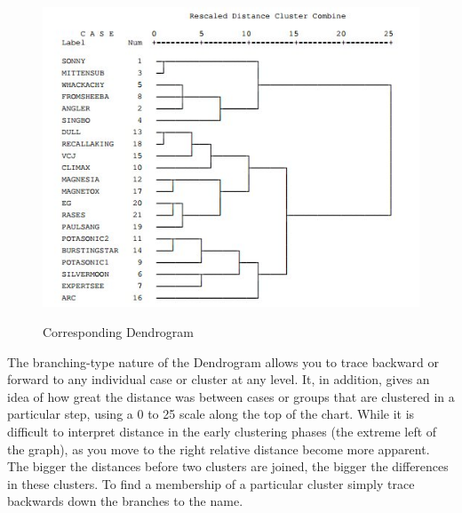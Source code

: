 \documentclass[a4paper,12pt]{article}
\begin{document}
\begin{figure}
	\includegraphics[scale=1.0]{images/Dendro}\\
	\caption{Corresponding Dendrogram}
\end{figure}

The branching-type nature of the Dendrogram allows you to trace backward or forward to any individual
case or cluster at any level. It, in addition, gives an idea of how great the distance was between cases or
groups that are clustered in a particular step, using a 0 to 25 scale along the top of the chart. While it is
difficult to interpret distance in the early clustering phases (the extreme left of the graph), as you move to
the right relative distance become more apparent. The bigger the distances before two clusters are joined,
the bigger the differences in these clusters. To find a membership of a particular cluster simply trace
backwards down the branches to the name.

\newpage
\end{document}
